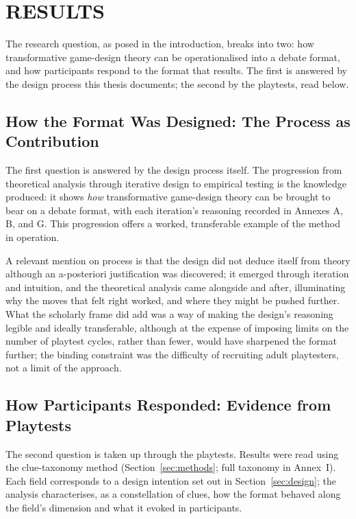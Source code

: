 \section{RESULTS}
\label{sec:results}

The research question, as posed in the introduction, breaks into two: how transformative game-design theory can be operationalised into a debate format, and how participants respond to the format that results. The first is answered by the design process this thesis documents; the second by the playtests, read below.

\subsection{How the Format Was Designed: The Process as Contribution}

The first question is answered by the design process itself. The progression from theoretical analysis through iterative design to empirical testing is the knowledge produced: it shows \emph{how} transformative game-design theory can be brought to bear on a debate format, with each iteration's reasoning recorded in Annexes A, B, and G. This progression offers a worked, transferable example of the method in operation.

A relevant mention on process is that the design did not deduce itself from theory although an a-posteriori justification was discovered; it emerged through iteration and intuition, and the theoretical analysis came alongside and after, illuminating why the moves that felt right worked, and where they might be pushed further. What the scholarly frame did add was a way of making the design's reasoning legible and ideally transferable, although at the expense of imposing limits on the number of playtest cycles, rather than fewer, would have sharpened the format further; the binding constraint was the difficulty of recruiting adult playtesters, not a limit of the approach.

\subsection{How Participants Responded: Evidence from Playtests}

The second question is taken up through the playtests. Results were read using the clue-taxonomy method (Section~\ref{sec:methods}; full taxonomy in Annex~I). Each field corresponds to a design intention set out in Section~\ref{sec:design}; the analysis characterises, as a constellation of clues, how the format behaved along the field's dimension and what it evoked in participants.

